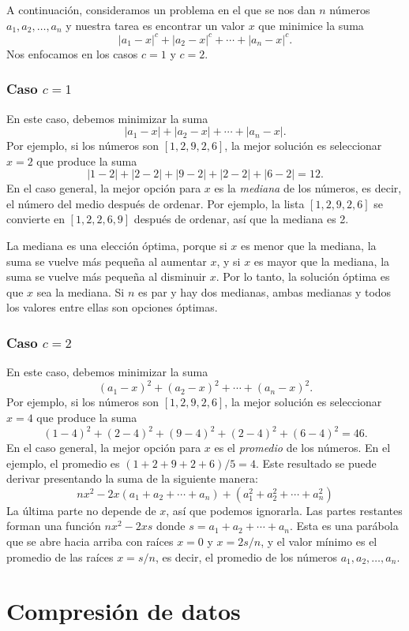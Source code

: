 A continuación, consideramos un problema en el que
se nos dan $n$ números $a_1,a_2,\ldots,a_n$
y nuestra tarea es encontrar un valor $x$
que minimice la suma
\[|a_1-x|^c+|a_2-x|^c+\cdots+|a_n-x|^c.\]
Nos enfocamos en los casos $c=1$ y $c=2$.

\subsubsection{Caso $c=1$}

En este caso, debemos minimizar la suma
\[|a_1-x|+|a_2-x|+\cdots+|a_n-x|.\]
Por ejemplo, si los números son $[1,2,9,2,6]$,
la mejor solución es seleccionar $x=2$
que produce la suma
\[
|1-2|+|2-2|+|9-2|+|2-2|+|6-2|=12.
\]
En el caso general, la mejor opción para $x$
es la \textit{mediana} de los números,
es decir, el número del medio después de ordenar.
Por ejemplo, la lista $[1,2,9,2,6]$
se convierte en $[1,2,2,6,9]$ después de ordenar,
así que la mediana es 2.

La mediana es una elección óptima,
porque si $x$ es menor que la mediana,
la suma se vuelve más pequeña al aumentar $x$,
y si $x$ es mayor que la mediana,
la suma se vuelve más pequeña al disminuir $x$.
Por lo tanto, la solución óptima es que $x$
sea la mediana.
Si $n$ es par y hay dos medianas,
ambas medianas y todos los valores entre ellas
son opciones óptimas.

\subsubsection{Caso $c=2$}

En este caso, debemos minimizar la suma
\[(a_1-x)^2+(a_2-x)^2+\cdots+(a_n-x)^2.\]
Por ejemplo, si los números son $[1,2,9,2,6]$,
la mejor solución es seleccionar $x=4$
que produce la suma
\[
(1-4)^2+(2-4)^2+(9-4)^2+(2-4)^2+(6-4)^2=46.
\]
En el caso general, la mejor opción para $x$
es el \emph{promedio} de los números.
En el ejemplo, el promedio es $(1+2+9+2+6)/5=4$.
Este resultado se puede derivar presentando
la suma de la siguiente manera:
\[
nx^2 - 2x(a_1+a_2+\cdots+a_n) + (a_1^2+a_2^2+\cdots+a_n^2)
\]
La última parte no depende de $x$,
así que podemos ignorarla.
Las partes restantes forman una función
$nx^2-2xs$ donde $s=a_1+a_2+\cdots+a_n$.
Esta es una parábola que se abre hacia arriba
con raíces $x=0$ y $x=2s/n$,
y el valor mínimo es el promedio
de las raíces $x=s/n$, es decir,
el promedio de los números $a_1,a_2,\ldots,a_n$.

\section{Compresión de datos}

